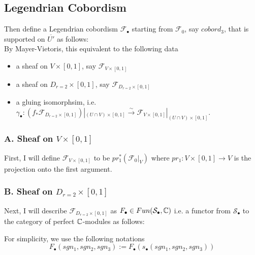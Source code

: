 \subsection*{Legendrian Cobordism}
Then define a Legendrian cobordism $\mathscr{F}_\bullet$ starting from $\mathscr{F}_0$, say $cobord_3$, that is supported on $\overline{U'}$ as follows:\\

By Mayer-Vietoris, this equivalent to the following data
\begin{itemize}
\item a sheaf on $V\times [0,1]$, say $\mathscr{F}_{V\times [0,1]}$

\item a sheaf on $D_{r=2}\times [0,1]$, say $\mathscr{F}_{D_{r=2}\times [0,1]}$

\item a gluing isomorphsim, i.e. $\gamma_\bullet : (f_*\mathscr{F}_{D_{r=2}\times [0,1]})|_{(U\cap V)\times [0,1]} \xrightarrow{\sim} \mathscr{F}_{V\times [0,1]}|_{(U\cap V)\times [0,1]}$.
\end{itemize}
\subsubsection{A. Sheaf on $V\times [0,1]$}
First, I will define $\mathscr{F}_{V\times [0,1]}$ to be $pr_1^*(\mathscr{F}_0|_V)$ where $pr_1 : V \times [0,1] \rightarrow V$ is the projection onto the first argument.
\subsubsection{B. Sheaf on $D_{r=2}\times [0,1]$}
Next, I will describe $\mathscr{F}_{D_{r=2}\times [0,1]}$ as $F_\bullet \in Fun(\mathcal{S}_\bullet,\mathbb{C})$ i.e. a functor from $\mathcal{S}_\bullet$ to the category of perfect $\mathbb{C}$-modules as follows: 

For simplicity, we use the following notations
\[
F_\bullet(sgn_1,sgn_2,sgn_3):= F_\bullet(s_\bullet(sgn_1,sgn_2,sgn_3))
\]

